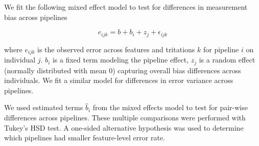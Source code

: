 \documentclass[linenumbers]{bmcart}
\begin{document}
We fit the following mixed effect model to test for differences in measurement bias across pipelines

$$
e_{ijk} = b + b_i + z_j + \epsilon_{ijk}
$$

where $e_{ijk}$ is the observed error across features and tritations $k$ for pipeline $i$ on individual $j$. $b_i$ is a fixed term modeling the pipeline effect, $z_j$ is a random effect (normally distributed with mean 0) capturing overall bias differences across individuals. We fit a similar model for differences in error variance across pipelines.

We used estimated terms $\hat{b}_i$ from the mixed effects model to test for pair-wise differences across pipelines.
These multiple comparisons were performed with Tukey's HSD test. A one-sided
alternative hypothesis was used to determine which pipelines had smaller
feature-level error rate.

\end{document}
